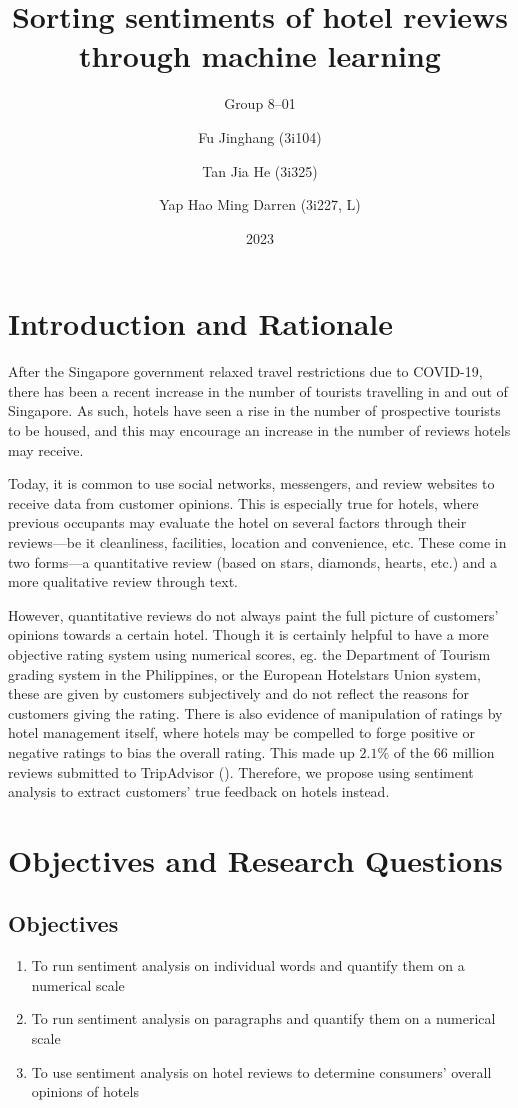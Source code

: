 \documentclass[12pt,bibliography=totocnumbered]{scrartcl}
\title{Sorting sentiments of hotel reviews through machine learning}
\subtitle{Group 8--01}
\author{
	Fu Jinghang (3i104) \and
	Tan Jia He (3i325) \and
	Yap Hao Ming Darren (3i227, L)
}
\date{2023}
\begin{document}
\pagestyle{scrheadings}

{
\doublespacing

\maketitle
\pagebreak
\tableofcontents
\pagebreak

\section{Introduction and Rationale}
After the Singapore government relaxed travel restrictions due to COVID-19,
there has been a recent increase in the number of tourists travelling in and out of Singapore.
As such, hotels have seen a rise in the number of prospective tourists to be housed,
and this may encourage an increase in the number of reviews hotels may receive.

Today, it is common to use social networks, messengers, and review websites
to receive data from customer opinions. This is especially true for hotels,
where previous occupants may evaluate the hotel on several factors through their
reviews---be it cleanliness, facilities, location and convenience, etc.
These come in two forms---a quantitative review (based on stars, diamonds, hearts, etc.)
and a more qualitative review through text.

However, quantitative reviews do not always paint the full picture of customers'
opinions towards a certain hotel. Though it is certainly helpful to have a more
objective rating system using numerical scores, eg. the Department of Tourism grading system in
the Philippines, or the European Hotelstars Union system,
these are given by customers subjectively and do not reflect the reasons for customers giving the rating.
There is also evidence of manipulation of ratings by hotel management itself, where hotels may be
compelled to forge positive or negative ratings to bias the overall rating.
This made up $2.1\%$ of the $66$ million reviews submitted to TripAdvisor (\cite{tripadvisor}).
Therefore, we propose using sentiment analysis to extract customers' true feedback on hotels instead.

\section{Objectives and Research Questions}
\subsection{Objectives}
\begin{enumerate}
	\item To run sentiment analysis on individual words and quantify them on a numerical scale
	\item To run sentiment analysis on paragraphs and quantify them on a numerical scale
	\item To use sentiment analysis on hotel reviews to determine consumers' overall opinions of hotels
\end{enumerate}

}
\end{document}
